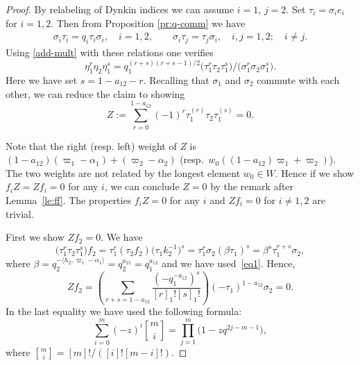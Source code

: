 \documentclass[pdftex]{sigma}
\begin{document}
\begin{proof}
By relabeling of Dynkin indices we can assume $i=1$, $j=2$.
Set $\tau_i=\sigma_ie_i$ for $i=1,2$. Then from Proposition \ref{pr:q-comm} we have
\begin{gather}\label{eq1}
\sigma_i \tau_i=q_i \tau_i \sigma_i,\quad i=1,2, \qquad
\sigma_i \tau_j=\tau_j \sigma_i, \quad i,j=1,2; \quad i\neq j.
\end{gather}
Using \eqref{add-mult} with these relations one verif\/ies
\[
\eta_1^{r}\eta_2 \eta_1^{s}=q_1^{(r+s)(r+s-1)/2}\big(\tau_1^r\tau_2\tau_1^s\big)/\big(\sigma_1^r\sigma_2\sigma_1^s\big).
\]
Here we have set $s=1-a_{12}-r$. Recalling that $\sigma_1$ and $\sigma_2$ commute with each other,
we can reduce the claim to showing
\[
Z:=\sum_{r=0}^{1-a_{12}}(-1)^r\tau_1^{(r)}\tau_2 \tau_1^{(s)}=0.
\]

Note that the right (resp. left) weight of $Z$ is $(1-a_{12})(\varpi_1-\alpha_1)+(\varpi_2-\alpha_2)$
(resp.\ $w_0((1-a_{12})\varpi_1+\varpi_2)$).
The two weights are not related by the longest element $w_0 \in W$.
Hence if we show
$f_iZ=Z f_i=0$ for any $i$, we can conclude $Z=0$ by
the remark after Lemma~\ref{le:ff}.
The properties $f_iZ=0$ for any $i$ and $Z f_i=0$ for $i\neq 1,2$ are trivial.

First we show $Z f_2=0$. We have
\[
\big(\tau_1^r \tau_2 \tau_1^s\big) f_2
=\tau_1^r (\tau_2 f_2) \big(\tau_1 k_2^{-1}\big)^s
=\tau_1^r \sigma_2 (\beta \tau_1)^s=\beta^s \tau_1^{r+s} \sigma_2,
\]
where $\beta=q_2^{-\langle h_2,\varpi_1-\alpha_1 \rangle}=q_2^{a_{21}}=q_1^{a_{12}}$ and
we have used~\eqref{eq1}. Hence,
\[
Z f_2
=\left(\sum_{r+s=1-a_{12}} \frac{(-q_1^{-a_{12}})^s}{[r]_1![s]_1!} \right)
(-\tau_1)^{1-a_{12}} \sigma_2=0.
\]
In the last equality we have used the following formula:
\[
\sum_{i=0}^m(-z)^i{m\brack i}=\prod_{j=1}^m\big(1-zq^{2j-m-1}\big),
\]
where ${m\brack i}=[m]!/([i]![m-i]!)$.


\end{proof}
\end{document}
